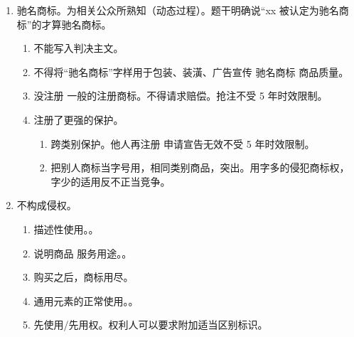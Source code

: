 \begin{enumerate}
\begin{enumerate}
          \item 仿冒。很像，但不完全一样。善意侵权不赔钱。。
          \item 制造、销售。销售不管善意恶意，有价无价。。
          \item 反向假冒。换掉商标 + 再次销售。。
          \item 帮助侵权。要求明知。。
          \item 其他。当字号用、类似商品、突出使用。
        \end{enumerate}
  \item 驰名商标。为相关公众所熟知（动态过程）。题干明确说“xx 被认定为驰名商标”的才算驰名商标。
        \begin{enumerate}
          \item 不能写入判决主文。
          \item 不得将“驰名商标”字样用于包装、装潢、广告宣传 \yjt 驰名商标 \bdy 商品质量。
          \item 没注册 \ydy 一般的注册商标。不得请求赔偿。抢注不受 5 年时效限制。
          \item 注册了更强的保护。
                \begin{enumerate}
                  \item 跨类别保护。他人再注册 \yjt 申请宣告无效不受 5 年时效限制。
                  \item 把别人商标当字号用，相同类别商品，突出。用字多的侵犯商标权，字少的适用反不正当竞争。
                \end{enumerate}
        \end{enumerate}
  \item 不构成侵权。
        \begin{enumerate}
          \item 描述性使用。。
          \item 说明商品 \hz 服务用途。。
          \item 购买之后，商标用尽。
          \item 通用元素的正常使用。。
          \item 先使用/先用权。权利人可以要求附加适当区别标识。
        \end{enumerate}
\end{enumerate}

